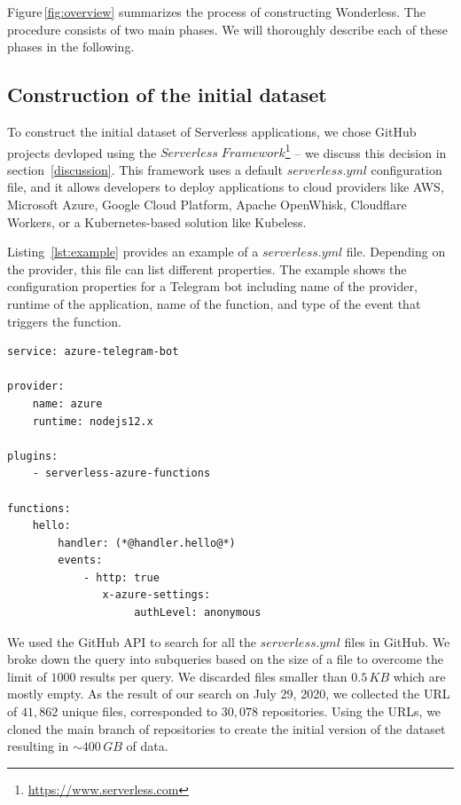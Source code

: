 Figure\,\ref{fig:overview} summarizes the  process of constructing Wonderless. 
The procedure consists of two main phases. 
We will thoroughly describe each of these phases in the following.

\subsection{Construction of the initial dataset} \label{phaseA}

To construct the initial dataset of Serverless applications, we chose GitHub projects 
devloped using the $Serverless \; Framework$\footnote{\url{https://www.serverless.com}} 
-- we discuss this decision in section~\ref{discussion}.
This framework uses a default $serverless.yml$ configuration file, 
and it allows developers to deploy 
applications to cloud providers like AWS, Microsoft Azure, Google Cloud 
Platform, Apache OpenWhisk, Cloudflare Workers, or a Kubernetes-based 
solution like Kubeless.

Listing~\ref{lst:example} provides an example of a $serverless.yml$ file. 
Depending on the provider, this file can list different properties.
The example shows the configuration properties for a Telegram bot including 
name of the provider, runtime of the application, name of the function, 
and type of the event that triggers the function. 

\vspace{1mm}

\begin{lstlisting}[frame=single, caption=An example of a serverless.yml configuration file., label={lst:example}, captionpos=b]
service: azure-telegram-bot 

provider:  
	name: azure
	runtime: nodejs12.x  
	
plugins:  
	- serverless-azure-functions 

functions:
	hello:    
		handler: (*@handler.hello@*)
		events:   
			- http: true        
			   x-azure-settings:          
			   		authLevel: anonymous
\end{lstlisting}


We used the GitHub API to search for all the $serverless.yml$ files in GitHub. 
We broke down the query into subqueries based on the size of a file to 
overcome the limit of $1000$ results per query.
We discarded files smaller than $0.5\,KB$ which are mostly empty.
As the result of our search on July 29, 2020, 
we collected the URL of $41,862$ unique files, corresponded to 
$30,078$ repositories. Using the URLs, we cloned the main branch 
of repositories to create the initial version of the dataset resulting 
in $\sim400 \, GB$ of data.




